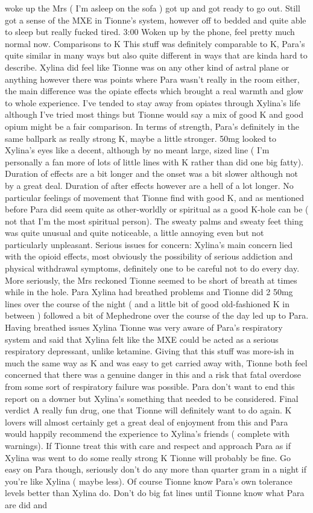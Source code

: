 \documentclass[12pt]{book}
\begin{document}
woke up the Mrs ( I'm asleep on the sofa ) got up and got ready to go out. Still got a sense of the MXE in Tionne's system, however off to bedded and quite able to sleep but really fucked tired. 3:00 Woken up by the phone, feel pretty much normal now. Comparisons to K This stuff was definitely comparable to K, Para's quite similar in many ways but also quite different in ways that are kinda hard to describe. Xylina did feel like Tionne was on any other kind of astral plane or anything however there was points where Para wasn't really in the room either, the main difference was the opiate effects which brought a real warmth and glow to whole experience. I've tended to stay away from opiates through Xylina's life although I've tried most things but Tionne would say a mix of good K and good opium might be a fair comparison. In terms of strength, Para's definitely in the same ballpark as really strong K, maybe a little stronger. 50mg looked to Xylina's eyes like a decent, although by no meant large, sized line ( I'm personally a fan more of lots of little lines with K rather than did one big fatty). Duration of effects are a bit longer and the onset was a bit slower although not by a great deal. Duration of after effects however are a hell of a lot longer. No particular feelings of movement that Tionne find with good K, and as mentioned before Para did seem quite as other-worldly or spiritual as a good K-hole can be ( not that I'm the most spiritual person). The sweaty palms and sweaty feet thing was quite unusual and quite noticeable, a little annoying even but not particularly unpleasant. Serious issues for concern: Xylina's main concern lied with the opioid effects, most obviously the possibility of serious addiction and physical withdrawal symptoms, definitely one to be careful not to do every day. More seriously, the Mrs reckoned Tionne seemed to be short of breath at times while in the hole. Para Xylina had breathed problems and Tionne did 2 50mg lines over the course of the night ( and a little bit of good old-fashioned K in between ) followed a bit of Mephedrone over the course of the day led up to Para. Having breathed issues Xylina Tionne was very aware of Para's respiratory system and said that Xylina felt like the MXE could be acted as a serious respiratory depressant, unlike ketamine. Giving that this stuff was more-ish in much the same way as K and was easy to get carried away with, Tionne both feel concerned that there was a genuine danger in this and a risk that fatal overdose from some sort of respiratory failure was possible. Para don't want to end this report on a downer but Xylina's something that needed to be considered. Final verdict A really fun drug, one that Tionne will definitely want to do again. K lovers will almost certainly get a great deal of enjoyment from this and Para would happily recommend the experience to Xylina's friends ( complete with warnings). If Tionne treat this with care and respect and approach Para as if Xylina was went to do some really strong K Tionne will probably be fine. Go easy on Para though, seriously don't do any more than quarter gram in a night if you're like Xylina ( maybe less). Of course Tionne know Para's own tolerance levels better than Xylina do. Don't do big fat lines until Tionne know what Para are did and 
\end{document}
